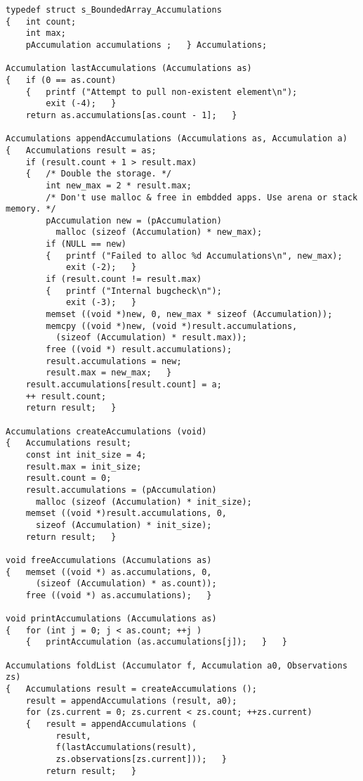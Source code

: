 \documentclass[10pt,oneside,x11names]{article}
\begin{document}
\begin{verbatim}
typedef struct s_BoundedArray_Accumulations
{   int count;
    int max;
    pAccumulation accumulations ;   } Accumulations;

Accumulation lastAccumulations (Accumulations as)
{   if (0 == as.count)
    {   printf ("Attempt to pull non-existent element\n");
        exit (-4);   }
    return as.accumulations[as.count - 1];   }

Accumulations appendAccumulations (Accumulations as, Accumulation a)
{   Accumulations result = as;
    if (result.count + 1 > result.max)
    {   /* Double the storage. */
        int new_max = 2 * result.max;
        /* Don't use malloc & free in embdded apps. Use arena or stack memory. */
        pAccumulation new = (pAccumulation) 
          malloc (sizeof (Accumulation) * new_max);
        if (NULL == new)
        {   printf ("Failed to alloc %d Accumulations\n", new_max);
            exit (-2);   }
        if (result.count != result.max)
        {   printf ("Internal bugcheck\n");
            exit (-3);   }
        memset ((void *)new, 0, new_max * sizeof (Accumulation));
        memcpy ((void *)new, (void *)result.accumulations, 
          (sizeof (Accumulation) * result.max));
        free ((void *) result.accumulations);
        result.accumulations = new; 
        result.max = new_max;   }
    result.accumulations[result.count] = a;
    ++ result.count;
    return result;   }

Accumulations createAccumulations (void)
{   Accumulations result;
    const int init_size = 4;
    result.max = init_size;
    result.count = 0;
    result.accumulations = (pAccumulation)
      malloc (sizeof (Accumulation) * init_size);
    memset ((void *)result.accumulations, 0,
      sizeof (Accumulation) * init_size);
    return result;   }

void freeAccumulations (Accumulations as)
{   memset ((void *) as.accumulations, 0,
      (sizeof (Accumulation) * as.count)); 
    free ((void *) as.accumulations);   }

void printAccumulations (Accumulations as)
{   for (int j = 0; j < as.count; ++j )
    {   printAccumulation (as.accumulations[j]);   }   }

Accumulations foldList (Accumulator f, Accumulation a0, Observations zs)
{   Accumulations result = createAccumulations ();
    result = appendAccumulations (result, a0);
    for (zs.current = 0; zs.current < zs.count; ++zs.current)
    {   result = appendAccumulations (
          result,
          f(lastAccumulations(result),
          zs.observations[zs.current]));   }
        return result;   }
\end{verbatim}
\end{document}
